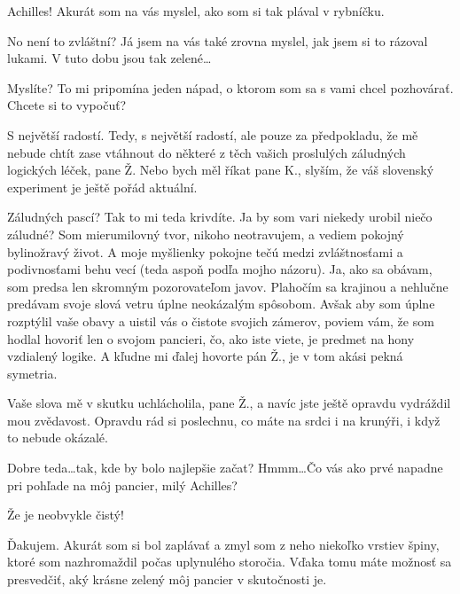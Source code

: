 \documentclass[12pt]{article}
\begin{document}
\begin{description}[itemsep=0pt]

\item[Ž:] Achilles! Akurát som na vás myslel, ako som si tak plával v rybníčku.

\item[A:] No není to zvláštní? Já jsem na vás také zrovna myslel, jak jsem si
    to rázoval lukami. V tuto dobu jsou tak zelené…

\item[Ž:] Myslíte? To mi pripomína jeden nápad, o ktorom som sa s vami chcel pozhovárať. 
    Chcete si to vypočuť?

\item[A:] S největší radostí. Tedy, s největší radostí, ale pouze za předpokladu,
    že mě nebude chtít zase vtáhnout do některé z těch vašich proslulých
    záludných logických léček, pane Ž. Nebo bych měl říkat pane K., slyším, 
    že váš slovenský experiment je ještě pořád aktuální.

\item[Ž:] Záludných pascí? Tak to mi teda krivdíte. Ja by som vari niekedy 
    urobil niečo záludné? Som mierumilovný tvor, nikoho neotravujem, a vediem 
    pokojný bylinožravý život. A moje myšlienky pokojne tečú medzi zvláštnosťami a 
    podivnosťami behu vecí (teda aspoň podľa mojho názoru). Ja, ako sa obávam, som 
    predsa len skromným pozorovateľom javov. Plahočím sa krajinou a nehlučne predávam 
    svoje slová vetru úplne neokázalým spôsobom. Avšak aby som úplne rozptýlil vaše 
    obavy a uistil vás o čistote svojich zámerov, poviem vám, že som hodlal hovoriť 
    len o svojom pancieri, čo, ako iste viete, je predmet na hony vzdialený logike. 
    A kľudne mi ďalej hovorte pán Ž., je v tom akási pekná symetria.

\item[A:] Vaše slova mě v skutku uchlácholila, pane Ž., a navíc jste ještě opravdu
    vydráždil mou zvědavost. Opravdu rád si poslechnu, co máte na srdci i na krunýři,
    i když to nebude okázalé.

\item[Ž:] Dobre teda\dots tak, kde by bolo najlepšie začat? Hmmm\dots Čo vás ako prvé 
    napadne pri pohľade na môj pancier, milý Achilles?

\item[A:] Že je neobvykle čistý!

\item[Ž:] Ďakujem. Akurát som si bol zaplávať a zmyl som z neho niekoľko vrstiev špiny, 
    ktoré som nazhromaždil počas uplynulého storočia. Vďaka tomu máte možnosť sa presvedčiť, 
    aký krásne zelený môj pancier v skutočnosti je.


\end{description}
\end{document}
